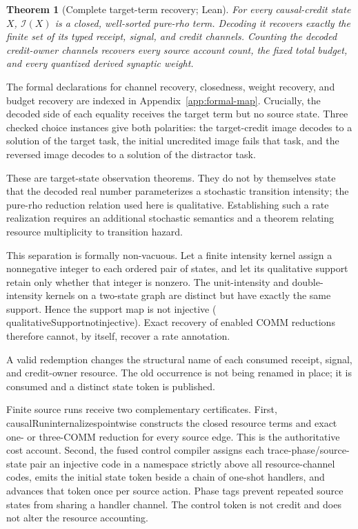 \documentclass[11pt]{article}
\newtheorem{theorem}{Theorem}[section]
\newcommand{\leanname}[1]{{\scriptsize\ttfamily
  \def\_{\textunderscore\allowbreak}#1}}
\begin{document}
\begin{theorem}[Complete target-term recovery; Lean]
For every causal-credit state $X$, $\mathcal I(X)$ is a closed, well-sorted
pure-rho term.  Decoding it recovers exactly the finite set of its typed
receipt, signal, and credit channels.  Counting the decoded credit-owner
channels recovers every source account count, the fixed total budget, and
every quantized derived synaptic weight.
\end{theorem}

The formal declarations for channel recovery, closedness, weight recovery,
and budget recovery are indexed in Appendix~\ref{app:formal-map}.  Crucially,
the decoded side of each equality receives the target term but no source
state.  Three checked choice instances give both polarities: the target-credit
image decodes to a solution of the target task, the initial uncredited image
fails that task, and the reversed image decodes to a solution of the distractor
task.

These are target-state observation theorems.  They do not by themselves state
that the decoded real number parameterizes a stochastic transition intensity;
the pure-rho reduction relation used here is qualitative.  Establishing such
a rate realization requires an additional stochastic semantics and a theorem
relating resource multiplicity to transition hazard.

This separation is formally non-vacuous.  Let a finite intensity kernel assign
a nonnegative integer to each ordered pair of states, and let its qualitative
support retain only whether that integer is nonzero.  The unit-intensity and
double-intensity kernels on a two-state graph are distinct but have exactly the
same support.  Hence the support map is not injective
(\leanname{qualitativeSupport\_not\_injective}).  Exact recovery of enabled
COMM reductions therefore cannot, by itself, recover a rate annotation.

A valid redemption changes the structural name of each consumed receipt,
signal, and credit-owner resource.  The old occurrence is not being renamed
in place; it is consumed and a distinct state token is published.

Finite source runs receive two complementary certificates.  First,
\leanname{causalRun\_internalizes\_pointwise} constructs the closed resource
terms and exact one- or three-COMM reduction for every source edge.  This is
the authoritative cost account.  Second, the fused control compiler assigns
each trace-phase/source-state pair an injective code in a namespace strictly
above all resource-channel codes, emits the initial state token beside a chain
of one-shot handlers, and advances that token once per source action.  Phase
tags prevent repeated source states from sharing a handler channel.  The
control token is not credit and does not alter the resource accounting.
\end{document}
